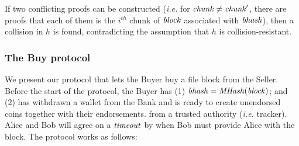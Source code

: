 If two conflicting proofs can be constructed (\emph{i.e.} for
${{\mathit{chunk}}}\neq{{\mathit{chunk}}}'$, there are proofs that
each of them is the $i^\mathit{th}$ chunk of ${{\mathit{block}}}$
associated with ${{\mathit{bhash}}}$), then a collision in $h$
is found, contradicting the assumption that $h$ is collision-resistant. 

\subsubsection{The Buy protocol}
We present our protocol that lets the Buyer buy a file block from the Seller.
Before the start of the protocol, the Buyer has (1) ${{\mathit{bhash}}} = {{\mathit{MHash}}}({{\mathit{block}}})$;
and (2) has withdrawn a wallet from the Bank and is ready to create unendorsed coins together with their endorsements.
from a trusted authority (\emph{i.e.} tracker).  Alice and Bob will agree on a
${{\mathit{timeout}}}$ by when Bob must provide Alice with the block.  The protocol
works as follows:

